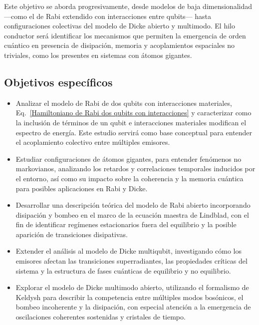 \documentclass[onecolumn,notitlepage,letterpaper,aps,pra,12pt]{article}
\numberwithin{equation}{section}
\begin{document}
Este objetivo se aborda progresivamente, desde modelos de baja dimensionalidad —como el de Rabi extendido con interacciones entre qubits— hasta configuraciones colectivas del modelo de Dicke abierto y multimodo. El hilo conductor será identificar los mecanismos que permiten la emergencia de orden cuántico en presencia de disipación, memoria y acoplamientos espaciales no triviales, como los presentes en sistemas con átomos gigantes.

\subsection*{Objetivos específicos}

\begin{itemize}
    \item Analizar el modelo de Rabi de dos qubits con interacciones materiales, Eq.~\eqref{Hamiltoniano de Rabi dos qubits con interacciones} y caracterizar como la inclusión de términos de un qubit e interacciones materiales modifican el espectro de energía. Este estudio servirá como base conceptual para entender el acoplamiento colectivo entre múltiples emisores.
    
    \item Estudiar configuraciones de átomos gigantes, para entender fenómenos no markovianos, analizando los retardos y correlaciones temporales inducidos por el entorno, así como su impacto sobre la coherencia y la memoria cuántica para posibles aplicaciones en Rabi y Dicke.
    

    \item Desarrollar una descripción teórica del modelo de Rabi abierto incorporando disipación y bombeo en el marco de la ecuación maestra de Lindblad, con el fin de identificar regímenes estacionarios fuera del equilibrio y la posible aparición de transiciones disipativas.

    \item Extender el análisis al modelo de Dicke multiqubit, investigando cómo los emisores afectan las transiciones superradiantes, las propiedades críticas del sistema y la estructura de fases cuánticas de equilibrio y no equilibrio.

    \item Explorar el modelo de Dicke multimodo abierto, utilizando el formalismo de Keldysh para describir la competencia entre múltiples modos bosónicos, el bombeo incoherente y la disipación, con especial atención a la emergencia de oscilaciones coherentes sostenidas y cristales de tiempo.

    


\end{itemize}
\end{document}
